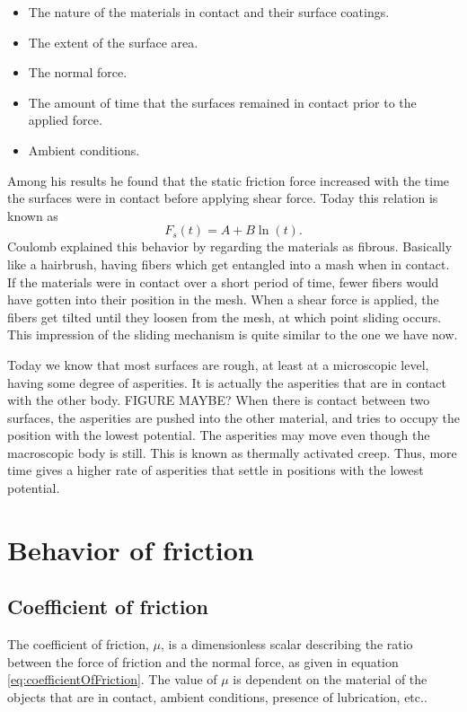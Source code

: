 \documentclass[twoside,english]{uiofysmaster}
\begin{document}
\begin{itemize}
	\item The nature of the materials in contact and their surface coatings.
	\item The extent of the surface area.
	\item The normal force.
	\item The amount of time that the surfaces remained in contact prior to the applied force.
	\item Ambient conditions.
\end{itemize}   
Among his results he found that the static friction force increased with the time the surfaces were in contact before applying shear force. 
Today this relation is known as
\begin{equation}
	F_s(t) = A+B\ln(t).
\end{equation}
Coulomb explained this behavior by regarding the materials as fibrous. 
Basically like a hairbrush, having fibers which get entangled into a mash when in contact. 
If the materials were in contact over a short period of time, fewer fibers would have gotten into their position in the mesh. 
When a shear force is applied, the fibers get tilted until they loosen from the mesh, at which point sliding occurs. 
This impression of the sliding mechanism is quite similar to the one we have now. 

Today we know that most surfaces are rough, at least at a microscopic level, having some degree of asperities. 
It is actually the asperities that are in contact with the other body. 
{\huge FIGURE MAYBE? } 
When there is contact between two surfaces, the asperities are pushed into the other material, and tries to occupy the position with the lowest potential.  
The asperities may move even though the macroscopic body is still. 
This is known as thermally activated creep.
Thus, more time gives a higher rate of asperities that settle in positions with the lowest potential. 
 


\section{Behavior of friction}




\subsection{Coefficient of friction}\label{sec:coefficientOfFriction}
The coefficient of friction, $\mu$, is a dimensionless scalar describing the ratio between the force of friction and the normal force, as given in equation \eqref{eq:coefficientOfFriction}.
The value of $\mu$ is dependent on the material of the objects that are in contact, ambient conditions, presence of lubrication, etc.. 
\end{document}
